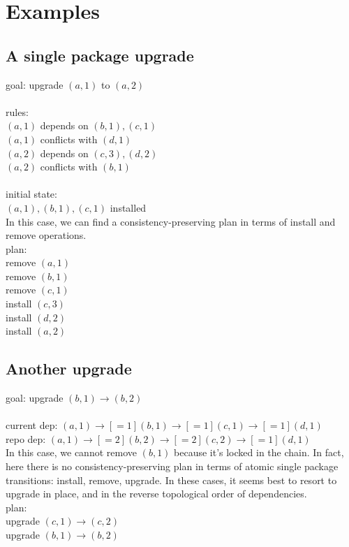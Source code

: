 \documentclass[a4paper,11pt]{article}
\begin{document}
\section{Examples}

\subsection{A single package upgrade}

goal: upgrade $(a,1)$ to $(a,2)$\\
\\
rules:\\
  $(a,1)$ depends on $(b,1), (c,1)$ \\
  $(a,1)$ conflicts with $(d,1)$\\
  $(a,2)$ depends on $(c,3), (d,2)$\\
  $(a,2)$ conflicts with $(b,1)$\\
\\
initial state:\\
  $(a,1), (b,1), (c,1)$ installed \\

In this case, we can find a consistency-preserving plan in terms of
install and remove operations.
\\
plan:\\
  remove $(a,1)$\\
  remove $(b,1)$\\
  remove $(c,1)$\\
  install $(c,3)$\\
  install $(d,2)$\\
  install $(a,2)$\\

\subsection{Another upgrade}

goal: upgrade $(b,1) \to (b,2)$\\
\\
current dep: $(a,1) \to[=1] (b,1) \to[=1] (c,1) \to[=1] (d,1)$\\
repo dep: \nobreakspace{} \nobreakspace$(a,1) \to[=2] (b,2) \to[=2] (c,2) \to[=1] (d,1)$\\

In this case, we cannot remove $(b,1)$ because it's locked in the
chain. In fact, here there is no consistency-preserving plan in terms
of atomic single package transitions: install, remove, upgrade. In
these cases, it seems best to resort to upgrade in place, and in the
reverse topological order of dependencies.
\\
plan:\\
 upgrade $(c,1) \to (c,2)$\\
 upgrade $(b,1) \to (b,2)$\\
\end{document}
